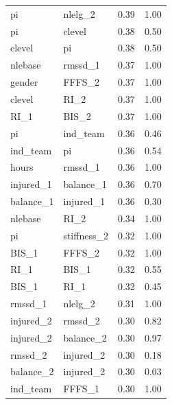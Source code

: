 \documentclass[
  english,
  man,floatsintext]{apa6}
\begin{document}
\begin{center}
\begin{ThreePartTable}
\begin{longtable}{llll}
pi & nlelg\_2 & 0.39 & 1.00\\
pi & clevel & 0.38 & 0.50\\
clevel & pi & 0.38 & 0.50\\
nlebase & rmssd\_1 & 0.37 & 1.00\\
gender & FFFS\_2 & 0.37 & 1.00\\
clevel & RI\_2 & 0.37 & 1.00\\
RI\_1 & BIS\_2 & 0.37 & 1.00\\
pi & ind\_team & 0.36 & 0.46\\
ind\_team & pi & 0.36 & 0.54\\
hours & rmssd\_1 & 0.36 & 1.00\\
injured\_1 & balance\_1 & 0.36 & 0.70\\
balance\_1 & injured\_1 & 0.36 & 0.30\\
nlebase & RI\_2 & 0.34 & 1.00\\
pi & stiffness\_2 & 0.32 & 1.00\\
BIS\_1 & FFFS\_2 & 0.32 & 1.00\\
RI\_1 & BIS\_1 & 0.32 & 0.55\\
BIS\_1 & RI\_1 & 0.32 & 0.45\\
rmssd\_1 & nlelg\_2 & 0.31 & 1.00\\
injured\_2 & rmssd\_2 & 0.30 & 0.82\\
injured\_2 & balance\_2 & 0.30 & 0.97\\
rmssd\_2 & injured\_2 & 0.30 & 0.18\\
balance\_2 & injured\_2 & 0.30 & 0.03\\
ind\_team & FFFS\_1 & 0.30 & 1.00\\
\bottomrule
\end{longtable}

\end{ThreePartTable}
\end{center}
\end{document}
